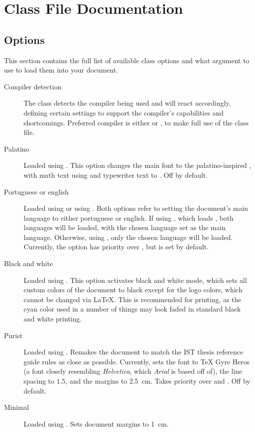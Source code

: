 \documentclass[palatino,english]{ist-report}
\begin{document}
\section{Class File Documentation}

\subsection{Options}\label{sec:options}

This section contains the full list of available class options and what argument to use to load them into your document.
\begin{description}
	\item [Compiler detection] The class detects the compiler being used and will react accordingly, defining certain settings to support the compiler's capabilities and shortcomings. Preferred compiler is either \XeLaTeX{} or \LuaLaTeX{}, to make full use of the class file\footnotemark{}. 
	\item [Palatino] Loaded using . This option changes the main font to the palatino-inspired , with math text using  and typewriter text to . Off by default.
	\item [Portuguese or english] Loaded using  or using . Both options refer to setting the document's main language to either portuguese or english. If using \XeLaTeX{}, which loads , both languages will be loaded, with the chosen language set as the main language. Otherwise, using , only the chosen language will be loaded. Currently, the  option has priority over , but  is set by default.
	\item [Black and white] Loaded using . This option activates black and white mode, which sets all custom colors of the document to black except for the logo colors, which cannot be changed via \LaTeX{}. This is recommended for printing, as the cyan color used in a number of things may look faded in standard black and white printing.
	\item [Purist] Loaded using . Remakes the document to match the IST thesis reference guide rules as close as possible. Currently, sets the font to \TeX{} Gyre Heros (a font closely resembling \textit{Helvetica}, which \textit{Arial} is based off of), the line spacing to $1.5$, and the margins to \SI{2.5}{\centi\meter}. Takes priority over  and . Off by default.
	\item [Minimal] Loaded using . Sets document margins to \SI{1}{\centi\meter}.%
\end{description}
\end{document}
